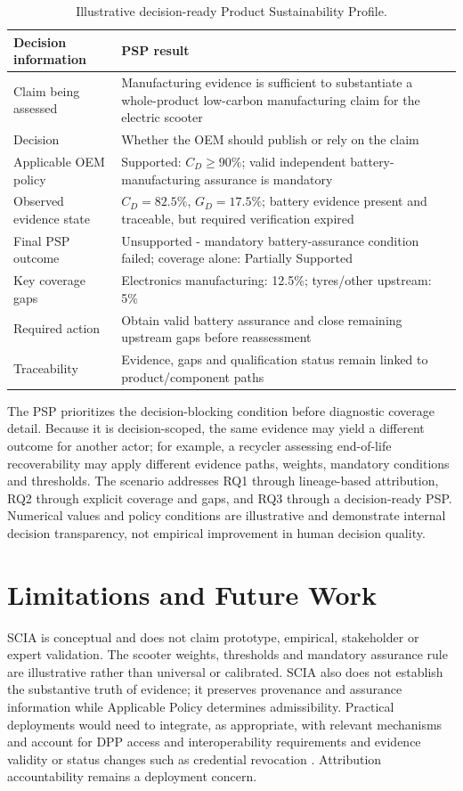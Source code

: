 \documentclass[english]{lni}
\begin{document}
\begin{table}[ht]
\centering
\caption{Illustrative decision-ready Product Sustainability Profile.}
\small
\begin{tabularx}{\textwidth}{>{\raggedright\arraybackslash}p{}X}
\toprule
\textbf{Decision information} & \textbf{PSP result}\\
\midrule
Claim being assessed & Manufacturing evidence is sufficient to substantiate a whole-product low-carbon manufacturing claim for the electric scooter\\
Decision & Whether the OEM should publish or rely on the claim\\
Applicable OEM policy & Supported: $C_D\geq90\%$; valid independent battery-manufacturing assurance is mandatory\\
Observed evidence state & $C_D=82.5\%$, $G_D=17.5\%$; battery evidence present and traceable, but required verification expired\\
Final PSP outcome & Unsupported - mandatory battery-assurance condition failed; coverage alone: Partially Supported\\
Key coverage gaps & Electronics manufacturing: 12.5\%; tyres/other upstream: 5\%\\
Required action & Obtain valid battery assurance and close remaining upstream gaps before reassessment\\
Traceability & Evidence, gaps and qualification status remain linked to product/component paths\\
\bottomrule
\end{tabularx}
\end{table}
\FloatBarrier

The PSP prioritizes the decision-blocking condition before diagnostic coverage detail. Because it is decision-scoped, the same evidence may yield a different outcome for another actor; for example, a recycler assessing end-of-life recoverability may apply different evidence paths, weights, mandatory conditions and thresholds. The scenario addresses RQ1 through lineage-based attribution, RQ2 through explicit coverage and gaps, and RQ3 through a decision-ready PSP. Numerical values and policy conditions are illustrative and demonstrate internal decision transparency, not empirical improvement in human decision quality.

\section{Limitations and Future Work}
SCIA is conceptual and does not claim prototype, empirical, stakeholder or expert validation. The scooter weights, thresholds and mandatory assurance rule are illustrative rather than universal or calibrated. SCIA also does not establish the substantive truth of evidence; it preserves provenance and assurance information while Applicable Policy determines admissibility. Practical deployments would need to integrate, as appropriate, with relevant mechanisms and account for DPP access and interoperability requirements \cite{EU24} and evidence validity or status changes such as credential revocation \cite{W3C25}. Attribution accountability remains a deployment concern.
\end{document}
